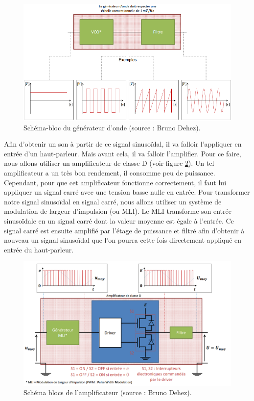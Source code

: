 \begin{figure}[ht]
	\centering
	\includegraphics[scale=0.6]{img-gf/gf-generator.png}
	\caption{Schéma-bloc du générateur d'onde (source : Bruno Dehez).}
	\label{fig:gf-generator}
\end{figure}

Afin d'obtenir un son à partir de ce signal sinusoïdal, il
va falloir l'appliquer en entrée d'un haut-parleur. Mais avant
cela, il va falloir l'amplifier. Pour ce faire, nous allons
utiliser un amplificateur de classe D (voir figure
\ref{fig:gf-ampli}). Un tel amplificateur
a un très bon rendement, il consomme peu de puissance. Cependant,
pour que cet amplificateur fonctionne correctement, il faut
lui appliquer un signal carré avec une tension basse nulle en entrée. Pour transformer
notre signal sinusoïdal en signal carré, nous allons utiliser un
système de modulation de largeur d'impulsion (ou MLI). Le MLI
transforme son entrée sinusoïdale en un signal carré dont la
valeur moyenne est égale à l'entrée. Ce
signal carré est ensuite amplifié par l'étage de puissance
et filtré afin d'obtenir à nouveau un signal sinusoïdal que
l'on pourra cette fois directement appliqué en entrée du haut-parleur.

\begin{figure}[ht]
	\centering
	\includegraphics[scale=0.55]{img-gf/gf-ampli.png}
	\caption{Schéma blocs de l'amplificateur (source : Bruno Dehez).}
	\label{fig:gf-ampli}
\end{figure}


